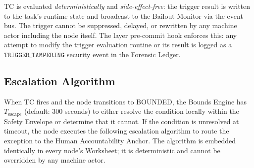 TC is evaluated \emph{deterministically} and \emph{side-effect-free}: the
trigger result is written to the task's runtime state and broadcast to the
Bailout Monitor via the event bus. The trigger cannot be suppressed, delayed,
or rewritten by any machine actor including the node itself. The \fact{} layer
pre-commit hook enforces this: any attempt to modify the trigger evaluation
routine or its result is logged as a $\texttt{TRIGGER\_TAMPERING}$ security
event in the Forensic Ledger.


\subsection{Escalation Algorithm}\label{sec:bailout-escalation}

When TC fires and the node transitions to BOUNDED, the Bounds Engine has
$T_{\text{escape}}$ (default: 300 seconds) to either resolve the condition
locally within the Safety Envelope or determine that it cannot. If the
condition is unresolved at timeout, the node executes the following escalation
algorithm to route the exception to the Human Accountability Anchor. The
algorithm is embedded identically in every node's Worksheet; it is
deterministic and cannot be overridden by any machine actor.

